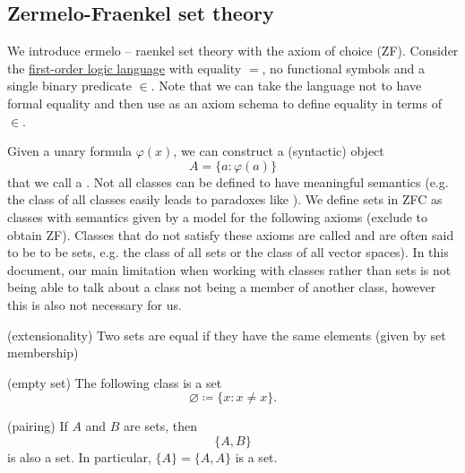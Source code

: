\subsection{Zermelo-Fraenkel set theory}\label{subsec:zermelo_fraenkel_set_theory}

\begin{definition}\label{def:zfc}
  We introduce ermelo – raenkel set theory with the axiom of choice (ZF). Consider the \hyperref[def:first_order_language]{first-order logic language} with equality \( = \), no functional symbols and a single binary predicate \( \in \). Note that we can take the language not to have formal equality and then use  as an axiom schema to define equality in terms of \( \in \).

  Given a unary formula \( \varphi(x) \), we can construct a (syntactic) object
  \begin{equation*}
    A = \{ a \colon \varphi(a) \}
  \end{equation*}
  that we call a . Not all classes can be defined to have meaningful semantics (e.g. the class of all classes easily leads to paradoxes like ). We define sets in ZFC as classes with semantics given by a model for the following axioms (exclude  to obtain ZF). Classes that do not satisfy these axioms are called  and are often said to be  to be sets, e.g. the class of all sets or the class of all vector spaces). In this document, our main limitation when working with classes rather than sets is not being able to talk about a class not being a member of another class, however this is also not necessary for us.

  \begin{thmenum}
    (extensionality) Two sets are equal if they have the same elements (given by set membership)

    (empty set) The following class is a set
    \begin{equation*}
      \varnothing \coloneqq \{ x \colon x \neq x \}.
    \end{equation*}

    (pairing) If \( A \) and \( B \) are sets, then
    \begin{equation*}
      \{ A, B \}
    \end{equation*}
    is also a set. In particular, \( \{ A \} = \{ A, A \} \) is a set.


\end{thmenum}
\end{definition}
